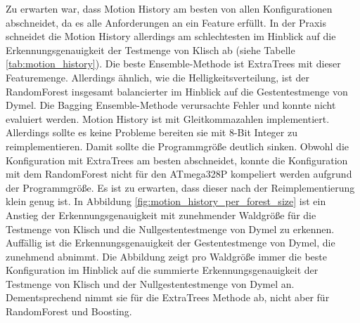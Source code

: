 \newline
\newline
Zu erwarten war, dass Motion History am besten von allen Konfigurationen abschneidet, da es alle Anforderungen an ein Feature erfüllt. In der Praxis schneidet die Motion History allerdings am schlechtesten
im Hinblick auf die Erkennungsgenauigkeit der Testmenge von Klisch ab (siehe Tabelle \ref{tab:motion_history}). Die beste Ensemble-Methode ist ExtraTrees mit dieser Featuremenge. Allerdings ähnlich, wie die
Helligkeitsverteilung, ist der RandomForest insgesamt balancierter im Hinblick auf die Gestentestmenge von Dymel. Die Bagging Ensemble-Methode verursachte Fehler und konnte nicht evaluiert werden.
\newline
\newline
Motion History ist mit Gleitkommazahlen implementiert. Allerdings sollte es keine Probleme bereiten sie mit 8-Bit Integer zu reimplementieren. Damit sollte die Programmgröße deutlich sinken. Obwohl die
Konfiguration mit ExtraTrees am besten abschneidet, konnte die Konfiguration mit dem RandomForest nicht für den ATmega328P kompeliert werden aufgrund der Programmgröße. Es ist zu erwarten, dass dieser nach
der Reimplementierung klein genug ist.
\newline
\newline
In Abbildung \ref{fig:motion_history_per_forest_size} ist ein Anstieg der Erkennungsgenauigkeit mit zunehmender Waldgröße für die Testmenge von Klisch und die Nullgestentestmenge von Dymel zu erkennen. Auffällig ist
die Erkennungsgenauigkeit der Gestentestmenge von Dymel, die zunehmend abnimmt. Die Abbildung zeigt pro Waldgröße immer die beste Konfiguration im Hinblick auf die summierte Erkennungsgenauigkeit der
Testmenge von Klisch und der Nullgestentestmenge von Dymel an. Dementsprechend nimmt sie für die ExtraTrees Methode ab, nicht aber für RandomForest und Boosting.

